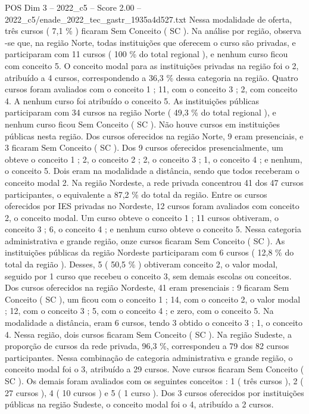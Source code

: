 \begin{textsample}{POS Dim 3 – 2022\_c5 – Score 2.00 – 2022\_c5/enade\_2022\_tec\_gastr\_1935a4d527.txt}
Nessa modalidade de oferta, três cursos ( 7,1 \% ) ficaram Sem Conceito ( SC ).
Na análise por região, observa -se que, na região Norte, todas instituições que oferecem o curso são privadas, e participaram com 11 cursos ( 100 \% do total regional ), e nenhum curso ficou com conceito 5.
O conceito modal para as instituições privadas na região foi o 2, atribuído a 4 cursos, correspondendo a 36,3 \% dessa categoria na região.
Quatro cursos foram avaliados com o conceito 1 ; 11, com o conceito 3 ; 2, com conceito 4.
A nenhum curso foi atribuído o conceito 5.
As instituições públicas participaram com 34 cursos na região Norte ( 49,3 \% do total regional ), e nenhum curso ficou Sem Conceito ( SC ).
Não houve cursos em instituições públicas nesta região.
Dos cursos oferecidos na região Norte, 9 eram presenciais, e 3 ficaram Sem Conceito ( SC ).
Dos 9 cursos oferecidos presencialmente, um obteve o conceito 1 ; 2, o conceito 2 ; 2, o conceito 3 ; 1, o conceito 4 ; e nenhum, o conceito 5.
Dois eram na modalidade a distância, sendo que todos receberam o conceito modal 2.
Na região Nordeste, a rede privada concentrou 41 dos 47 cursos participantes, o equivalente a 87,2 \% do total da região.
Entre os cursos oferecidos por IES privadas no Nordeste, 12 cursos foram avaliados com conceito 2, o conceito modal.
Um curso obteve o conceito 1 ; 11 cursos obtiveram, o conceito 3 ; 6, o conceito 4 ; e nenhum curso obteve o conceito 5.
Nessa categoria administrativa e grande região, onze cursos ficaram Sem Conceito ( SC ).
As instituições públicas da região Nordeste participaram com 6 cursos ( 12,8 \% do total da região ).
Desses, 5 ( 50,5 \% ) obtiveram conceito 2, o valor modal, seguido por 1 curso que recebeu o conceito 3, sem demais escolas ou conceitos.
Dos cursos oferecidos na região Nordeste, 41 eram presenciais : 9 ficaram Sem Conceito ( SC ), um ficou com o conceito 1 ; 14, com o conceito 2, o valor modal ; 12, com o conceito 3 ; 5, com o conceito 4 ; e zero, com o conceito 5.
Na modalidade a distância, eram 6 cursos, tendo 3 obtido o conceito 3 ; 1, o conceito 4.
Nessa região, dois cursos ficaram Sem Conceito ( SC ).
Na região Sudeste, a proporção de cursos da rede privada, 96,3 \%, correspondeu a 79 dos 82 cursos participantes.
Nessa combinação de categoria administrativa e grande região, o conceito modal foi o 3, atribuído a 29 cursos.
Nove cursos ficaram Sem Conceito ( SC ).
Os demais foram avaliados com os seguintes conceitos : 1 ( três cursos ), 2 ( 27 cursos ), 4 ( 10 cursos ) e 5 ( 1 curso ).
Dos 3 cursos oferecidos por instituições públicas na região Sudeste, o conceito modal foi o 4, atribuído a 2 cursos.

\end{textsample}
